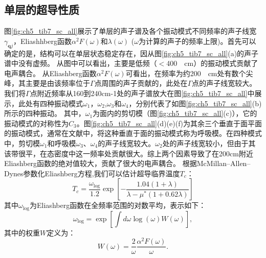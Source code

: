 \subsection{单层的超导性质}
图\ref{fig:ch5_tib7_sc_all}展示了单层的声子谱及各个振动模式不同频率的声子线宽$\gamma_{\bm{q}j}$，Eliashhberg函数$\alpha^2 F(\omega)$和$\lambda(\omega)$ ($\omega$为计算的声子的频率上限)。首先可以确定的是，结构可以在单层状态稳定存在，因从图\ref{fig:ch5_tib7_sc_all}(a)的声子谱中没有虚频。
从图中可以看出，主要是低频（$<$\SI{400}{\per\cm}）的振动模式贡献了电声耦合。
从Eliashberg函数$\alpha^2 F(\omega)$可看出，在频率为约\SI{200}{\per\cm}处有数个尖峰，其主要是由该频率位于$\Gamma$点周围的声子贡献的，此处在$\Gamma$点的声子线宽较大。我们将$\Gamma$点附近频率从160到240cm-1处的声子谱放大在图\ref{fig:ch5_tib7_sc_all}中展示，此处有四种振动模式$\omega_1$，$\omega_2$,$\omega_3$和$\omega_4$，分别代表了如图\ref{fig:ch5_tib7_sc_all}(b)所示的四种振动。
其中，$\omega_1$为面内的剪切模（图\ref{fig:ch5_tib7_sc_all}(c)），它的振动模式的对称性为$C_3$。图\ref{fig:ch5_tib7_sc_all}(d)(e)(f)为其余三个垂直于面平面的振动模式，通常在文献中，将这种垂直于面的振动模式称为呼吸模。在四种模式中，剪切模$\omega_1$和呼吸模$\omega_3$、$\omega_4$的声子线宽较大。$\omega_2$处的声子线宽较小，但由于其该带很平，在态密度中这一频率处贡献很大。综上两个因素导致了在200cm附近Eliashberg函数的绝对值较大，贡献了很大的电声耦合。
根据McMillan–Allen–Dynes参数化Eliashberg方程,我们可以估计超导临界温度$T_c$：
\begin{equation}
  T_c = \frac{\omega_{\mathrm{log}}}{1.2}
  \exp{\left[ {-\frac{1.04(1+\lambda)}{\lambda-\mu^*(1+0.62\lambda)}} \right]}
\end{equation}
其中$\omega_{\mathrm{log}}$为Eliashberg函数在全频率范围的对数平均，表示如下：
\begin{equation}
  \omega_\mathrm{log} = \exp \left[ {\int d\omega \log(\omega)W(\omega)} \right],
\end{equation}
其中的权重$W$定义为：
\begin{equation}
  W(\omega) = \frac{2}{\omega} \frac{\alpha^2 F(\omega)}{\omega}.
\end{equation}


